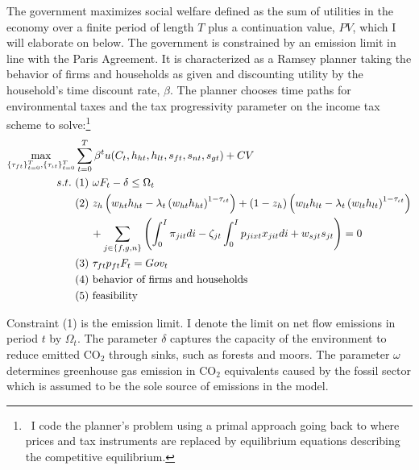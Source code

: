 The government maximizes social welfare defined as the sum of utilities in the economy over a finite period of length $T$ plus a continuation value, $PV$, which I will elaborate on below. The government is constrained by an emission limit in line with the Paris Agreement.  
It is characterized as a Ramsey planner taking the behavior of firms and households as given and discounting utility by the household's time discount rate, $\beta$.
The planner chooses time paths for environmental taxes and the tax progressivity parameter on the income tax scheme to solve:\footnote{\ I code the planner's problem using a primal approach going back to \cite{Lucas1983OptimalCapital} where prices and tax instruments are replaced by equilibrium equations describing the competitive equilibrium. }
\begin{align*}
\underset{\{\tau_{ft}\}_{t=0}^{T},\{\tau_{\iota t}\}_{t=0}^{T}}{\max}&\sum_{t=0}^{T}\beta^t u(C_{t}, h_{ht}, h_{lt}, s_{ft}, s_{nt}, s_{gt})%
+ CV\\
s.t.\ %
& (1)\ \omega F_{t} -\delta \leq \Omega_t %
\\ %
& (2)\ z_h\left(w_{ht}h_{ht}-\lambda_t \left(w_{ht}h_{ht}\right)^{1-\tau_{\iota t}}\right)+(1-z_h)\left(w_{lt}h_{lt}-\lambda_t\left(w_{lt}h_{lt}\right)^{1-\tau_{\iota t}}\right) \\
& \hspace{5mm} +\sum_{j\in\{f,g,n\}}\left(\int_{0}^{I}\pi_{jit}di-\zeta_{jt}\int_{0}^{I}p_{jixt}x_{jit}di+w_{sjt}s_{jt}\right)= 0\\ %
& (3)\ \tau_{ft}p_{ft}F_{t} = Gov_t\\
& (4)\ \text{behavior of firms and households}\\
& (5)\ \text{feasibility}
\end{align*}

Constraint (1) is the emission limit. I denote the limit on net flow emissions in period $t$ by $\Omega_t$.  The parameter $\delta$ captures the capacity of the environment to reduce emitted CO$_2$ through sinks, such as forests and moors.  The parameter $\omega$ determines greenhouse gas emission in CO$_2$ equivalents caused by the fossil sector which is assumed to be the sole source of emissions in the model. %

